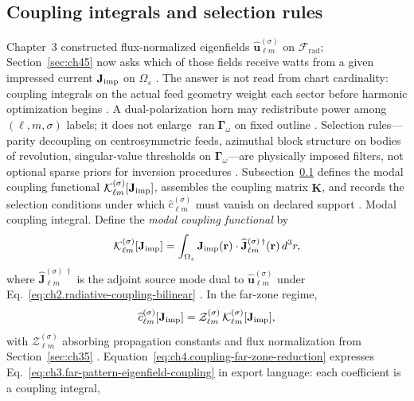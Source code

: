 \subsection{Coupling integrals and selection rules}
\label{sec:ch452}
Chapter~3 constructed flux-normalized eigenfields $\widehat{\mathbf{u}}_{\ell m}^{(\sigma)}$ on $\mathcal{F}_{\mathrm{rad}}$; Section~\ref{sec:ch45} now asks which of those fields receive watts from a given impressed current $\mathbf{J}_{\mathrm{imp}}$ on $\Omega_s$ \cite{stratton1941}. The answer is not read from chart cardinality: coupling integrals on the actual feed geometry weight each sector before harmonic optimization begins \cite{harrington2001}. A dual-polarization horn may redistribute power among $(\ell,m,\sigma)$ labels; it does not enlarge $\operatorname{ran}\boldsymbol{\Gamma}_\omega$ on fixed outline \cite{collin2001}.
Selection rules---parity decoupling on centrosymmetric feeds, azimuthal block structure on bodies of revolution, singular-value thresholds on $\boldsymbol{\Gamma}_\omega$---are physically imposed filters, not optional sparse priors for inversion procedures \cite{jackson1999}. Subsection~\ref{sec:ch452} defines the modal coupling functional $\mathcal{K}_{\ell m}^{(\sigma)}[\mathbf{J}_{\mathrm{imp}}]$, assembles the coupling matrix $\mathbf{K}$, and records the selection conditions under which $\widehat{c}_{\ell m}^{(\sigma)}$ must vanish on declared support \cite{hansen1988}.
Modal coupling integral. Define the \emph{modal coupling functional} by
\begin{equation}
\label{eq:ch4.modal-coupling-integral}
\mathcal{K}_{\ell m}^{(\sigma)}[\mathbf{J}_{\mathrm{imp}}]
=
\int_{\Omega_{s}}
\mathbf{J}_{\mathrm{imp}}(\mathbf{r})\cdot
\widehat{\mathbf{J}}_{\ell m}^{(\sigma)\,\dagger}(\mathbf{r})\,
d^{3}r,
\end{equation}
where \(\widehat{\mathbf{J}}_{\ell m}^{(\sigma)\,\dagger}\) is the adjoint source mode dual to
\(\widehat{\mathbf{u}}_{\ell m}^{(\sigma)}\) under Eq.~\eqref{eq:ch2.radiative-coupling-bilinear}
\cite{stratton1941}. In the far-zone regime,
\begin{equation}
\label{eq:ch4.coupling-far-zone-reduction}
\widehat{c}_{\ell m}^{(\sigma)}[\mathbf{J}_{\mathrm{imp}}]
=
\mathcal{Z}_{\ell m}^{(\sigma)}\,
\mathcal{K}_{\ell m}^{(\sigma)}[\mathbf{J}_{\mathrm{imp}}],
\end{equation}
with \(\mathcal{Z}_{\ell m}^{(\sigma)}\) absorbing propagation constants and flux normalization from
Section~\ref{sec:ch35} \cite{hansen1988}. Equation~\eqref{eq:ch4.coupling-far-zone-reduction} expresses Eq.~\eqref{eq:ch3.far-pattern-eigenfield-coupling} in export language: each coefficient is a coupling integral,
